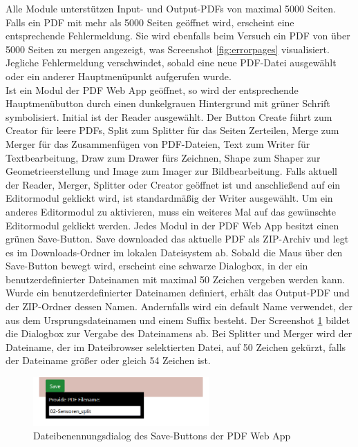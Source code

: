 Alle Module unterstützen Input- und Output-PDFs von maximal 5000 Seiten. Falls ein PDF mit mehr als 5000 Seiten geöffnet wird, erscheint eine entsprechende Fehlermeldung. Sie wird ebenfalls beim Versuch ein PDF von über 5000 Seiten zu mergen angezeigt, was Screenshot \ref{fig:errorpages} visualisiert. Jegliche Fehlermeldung verschwindet, sobald eine neue PDF-Datei ausgewählt oder ein anderer Hauptmenüpunkt aufgerufen wurde. \\
Ist ein Modul der PDF Web App geöffnet, so wird der entsprechende Hauptmenübutton durch einen dunkelgrauen Hintergrund mit grüner Schrift symbolisiert. Initial ist der Reader ausgewählt. Der Button Create führt zum Creator für leere PDFs, Split zum Splitter für das Seiten Zerteilen, Merge zum Merger für das Zusammenfügen von PDF-Dateien, Text zum Writer für Textbearbeitung, Draw zum Drawer fürs Zeichnen, Shape zum Shaper zur Geometrieerstellung und Image zum Imager zur Bildbearbeitung. Falls aktuell der Reader, Merger, Splitter oder Creator geöffnet ist und anschließend auf ein Editormodul geklickt wird, ist standardmäßig der Writer ausgewählt. Um ein anderes Editormodul zu aktivieren, muss ein weiteres Mal auf das gewünschte Editormodul geklickt werden. Jedes Modul in der PDF Web App besitzt einen grünen Save-Button. Save downloaded das aktuelle PDF als ZIP-Archiv und legt es im Downloads-Ordner im lokalen Dateisystem ab. Sobald die Maus über den Save-Button bewegt wird, erscheint eine schwarze Dialogbox, in der ein benutzerdefinierter Dateinamen mit maximal 50 Zeichen vergeben werden kann. Wurde ein benutzerdefinierter Dateinamen definiert, erhält das Output-PDF und der ZIP-Ordner dessen Namen. Andernfalls wird ein default Name verwendet, der aus dem Ursprungsdateinamen und einem Suffix besteht. Der Screenshot \ref{fig:save} bildet die Dialogbox zur Vergabe des Dateinamens ab. Bei Splitter und Merger wird der Dateiname, der im Dateibrowser selektierten Datei, auf 50 Zeichen gekürzt, falls der Dateiname größer oder gleich 54 Zeichen ist.

\begin{figure}[!htbp]
	\centering
	\includegraphics[width=0.6\textwidth]{"images/save.png"}
	\caption{Dateibenennungsdialog des Save-Buttons der PDF Web App}
	\label{fig:save}
\end{figure}

